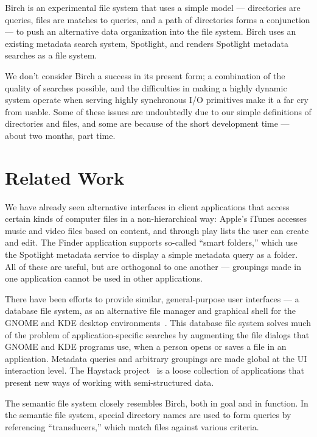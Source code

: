 \documentclass{article}
\begin{document}
Birch is an experimental file system that uses a simple
model --- directories are queries, files are matches to queries, and a
path of directories forms a conjunction --- to push an alternative
data organization into the file system. Birch uses an existing
metadata search system, Spotlight, and renders Spotlight metadata
searches as a file system.

We don't consider Birch a success in its present form; a combination
of the quality of searches possible, and the difficulties in making a
highly dynamic system operate when serving highly synchronous I/O
primitives make it a far cry from usable. Some of these issues are
undoubtedly due to our simple definitions of directories and files,
and some are because of the short development time --- about two
months, part time.


\section{Related Work}

We have already seen alternative interfaces in client applications
that access certain kinds of computer files in a non-hierarchical way:
Apple's iTunes accesses music and video files based on content, and
through play lists the user can create and edit. The Finder
application supports so-called ``smart folders,'' which use the
Spotlight metadata service to display a simple metadata query as a
folder. All of these are useful, but are orthogonal to one another ---
groupings made in one application cannot be used in other
applications.

There have been efforts to provide similar, general-purpose user
interfaces --- a database file system, as an alternative file manager
and graphical shell for the GNOME and KDE desktop
environments~\cite{Gorter:2004}. This database file system solves much
of the problem of application-specific searches by augmenting the file
dialogs that GNOME and KDE programs use, when a person opens or saves
a file in an application. Metadata queries and arbitrary groupings are
made global at the UI interaction level. The Haystack
project~\cite{Karger:2003} is a loose collection of applications that
present new ways of working with semi-structured data.

The semantic file system \cite{Gifford:1991} closely resembles Birch,
both in goal and in function. In the semantic file system, special
directory names are used to form queries by referencing
``transducers,'' which match files against various criteria.
\end{document}
